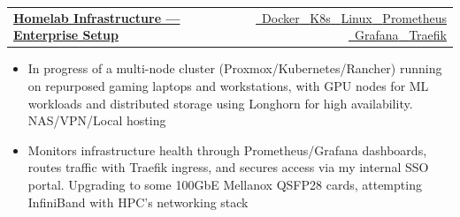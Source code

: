 \documentclass[letterpaper,10pt]{article}
\makeatletter
\newenvironment{ProjectNotes}{%
  \begingroup\fontsize{9.5}{11}\selectfont
  \begin{itemize}[label=--,leftmargin=0.2in,topsep=2pt,itemsep=2pt,parsep=0pt,partopsep=0pt]
}{%
  \end{itemize}\endgroup\vspace{4pt}
}
\newcommand{\TechTag}[1]{{\footnotesize #1}}
\newcommand{\IconTag}[2]{#1\ \TechTag{#2}}
\providecommand{\icTS}{\faIcon{js-square}}
\providecommand{\icReact}{\faIcon{react}}
\providecommand{\icVue}{\faIcon{vuejs}}
\providecommand{\icBulma}{\faIcon{buromobelexperte}}
\providecommand{\icThree}{\faIcon{cube}}
\providecommand{\icNode}{\faIcon{node-js}}
\providecommand{\icExpress}{\faIcon{server}}
\providecommand{\icSupabase}{\faIcon{database}}
\providecommand{\icDocker}{\faIcon{docker}}
\providecommand{\icKube}{\faIcon{dharmachakra}}
\providecommand{\icLinux}{\faIcon{linux}}
\providecommand{\icRender}{\faIcon{cloud-upload-alt}}
\providecommand{\icGrafana}{\faIcon{chart-line}}
\providecommand{\icProm}{\faIcon{chart-area}}
\providecommand{\icTraefik}{\faIcon{network-wired}}
\newcommand{\ProjectRow}[4]{%
  \vspace{0pt}
  \begin{tabular*}{\textwidth}{@{}l@{\extracolsep{\fill}}r@{}}
    \textbf{\href{#2}{#1}} & {\footnotesize \href{#3}{#4}}
  \end{tabular*}\par
  \vspace{-1pt}
}
\makeatother
\begin{document}

\ProjectRow{Homelab Infrastructure — Enterprise Setup}
{https://github.com/ndg8743}
{github.com/ndg8743}
{\IconTag{\icDocker}{Docker} \IconTag{\icKube}{K8s} \IconTag{\icLinux}{Linux} \IconTag{\icProm}{Prometheus} \IconTag{\icGrafana}{Grafana} \IconTag{\icTraefik}{Traefik}}
\begin{ProjectNotes}
  \item In progress of a multi-node cluster (Proxmox/Kubernetes/Rancher) running on repurposed gaming laptops and workstations, with GPU nodes for ML workloads and distributed storage using Longhorn for high availability. NAS/VPN/Local hosting
  \item Monitors infrastructure health through Prometheus/Grafana dashboards, routes traffic with Traefik ingress, and secures access via my internal SSO portal. Upgrading to some 100GbE Mellanox QSFP28 cards, attempting InfiniBand with HPC's networking stack
\end{ProjectNotes}
\end{document}
